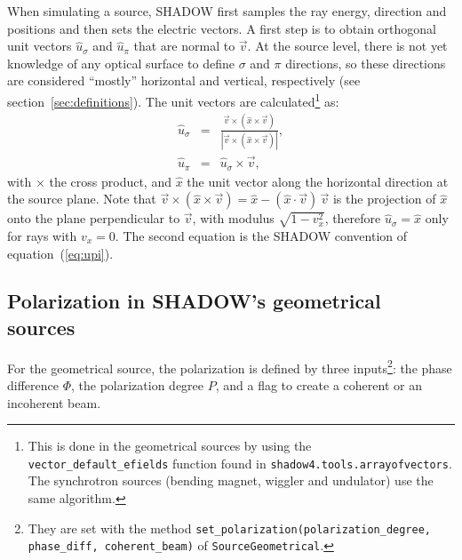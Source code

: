\documentclass{iucr}
\begin{document}
When simulating a source, SHADOW first samples the ray energy, direction and positions and then sets the electric vectors.
A first step is to obtain orthogonal unit vectors $\hat{u}_\sigma$ and $\hat{u}_\pi$ that are normal to $\vec{v}$.
At the source level, there is not yet knowledge of any optical surface to define $\sigma$ and $\pi$ directions, so these directions
are considered ``mostly'' horizontal and vertical, respectively (see section~\ref{sec:definitions}). The unit vectors are calculated\footnote{
This is done in the geometrical sources by using the {\tt vector\_default\_efields} function found in {\tt shadow4.tools.arrayofvectors}. The synchrotron sources (bending magnet, wiggler and undulator) use the same algorithm.
} as:
\begin{eqnarray}
   \hat{u}_\sigma &=& \frac{\vec{v} \times (\hat{x} \times \vec{v})}{\left|\vec{v} \times (\hat{x} \times \vec{v})\right|}, \nonumber \\
   \hat{u}_\pi &=& \hat{u}_\sigma \times  \vec{v},
\end{eqnarray}
with $\times$ the cross product, and $\hat{x}$ the unit vector along the horizontal direction at the source plane.
Note that $\vec{v} \times (\hat{x} \times \vec{v}) = \hat{x} - (\hat{x}\cdot\vec{v})\,\vec{v}$ is the projection of $\hat{x}$ onto the plane perpendicular to $\vec{v}$, with modulus $\sqrt{1-v_x^2}$, therefore $\hat{u}_\sigma=\hat{x}$ only for rays with $v_x=0$. The second equation is the SHADOW convention of equation~(\ref{eq:upi}).

\subsection{Polarization in SHADOW's geometrical sources}
\label{sec:polarization_shadow}

For the geometrical source, the polarization is defined by three inputs\footnote{They are set with the method {\tt set\_polarization(polarization\_degree, phase\_diff, coherent\_beam)} of {\tt SourceGeometrical}.}: the phase difference $\Phi$, the polarization degree $P$, and a flag to create a coherent or an incoherent beam.
\end{document}
